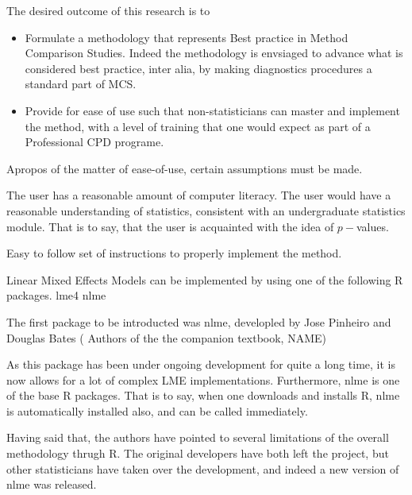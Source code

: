 \documentclass[12pt, a4paper]{report}
\begin{document}







The desired outcome of this research is to

\begin{itemize}
	\item Formulate a methodology that represents Best practice in Method Comparison Studies. Indeed the methodology is envsiaged to advance what is considered best practice, inter alia, by making diagnostics procedures a standard part of MCS. 
	
	\item Provide for ease of use such that non-statisticians can master and implement the method, with a level of training that one would expect 
	as part of a Professional CPD programe.
	
\end{itemize}

Apropos of the matter of ease-of-use, certain assumptions must be made.


The user has a reasonable amount of computer literacy.
The user would have a reasonable understanding of statistics, consistent with an undergraduate statistics module. 
That is to say, that the user is acquainted with the idea of $p-$values.

Easy to follow set of instructions to properly implement the method.


Linear Mixed Effects Models can be implemented by using one of the following R packages.
lme4
nlme

The first package to be introducted was nlme, developled by Jose Pinheiro and Douglas Bates ( Authors of the the companion textbook, NAME)

As this package has been under ongoing development for quite a long time, it is now allows for a lot of complex LME implementations. 
Furthermore, nlme is one of the base R packages.  That is to say, when one downloads and installs R, nlme is automatically installed also, and can be called immediately.

Having said that, the authors have pointed to several limitations of the overall methodology thrugh R.
The original developers have both left the project, but other statisticians have taken over the development, and indeed a new version of nlme was released.
\end{document}
